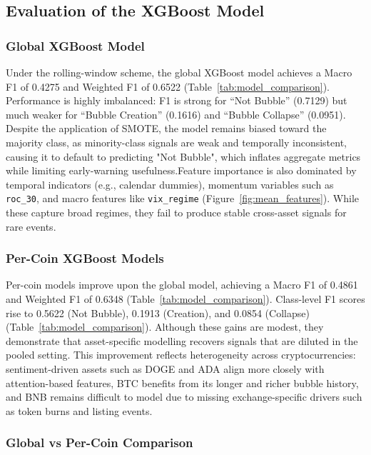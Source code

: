 \documentclass[12pt,a4paper]{article}
\begin{document}
\subsection{Evaluation of the XGBoost Model}

\subsubsection{Global XGBoost Model}

Under the rolling-window scheme, the global XGBoost model achieves a Macro F1 of 0.4275 and Weighted F1 of 0.6522 (Table~\ref{tab:model_comparison}). Performance is highly imbalanced: F1 is strong for “Not Bubble” (0.7129) but much weaker for “Bubble Creation” (0.1616) and “Bubble Collapse” (0.0951). Despite the application of SMOTE, the model remains biased toward the majority class, as minority-class signals are weak and temporally inconsistent, causing it to default to predicting "Not Bubble", which inflates aggregate metrics while limiting early-warning usefulness.Feature importance is also dominated by temporal indicators (e.g., calendar dummies), momentum variables such as \texttt{roc\_30}, and macro features like \texttt{vix\_regime} (Figure~\ref{fig:mean_features}). While these capture broad regimes, they fail to produce stable cross-asset signals for rare events.


\subsubsection{Per-Coin XGBoost Models}

Per-coin models improve upon the global model, achieving a Macro F1 of 0.4861 and Weighted F1 of 0.6348 (Table~\ref{tab:model_comparison}). Class-level F1 scores rise to 0.5622 (Not Bubble), 0.1913 (Creation), and 0.0854 (Collapse) (Table~\ref{tab:model_comparison}). Although these gains are modest, they demonstrate that asset-specific modelling recovers signals that are diluted in the pooled setting. This improvement reflects heterogeneity across cryptocurrencies: sentiment-driven assets such as DOGE and ADA align more closely with attention-based features, BTC benefits from its longer and richer bubble history, and BNB remains difficult to model due to missing exchange-specific drivers such as token burns and listing events.
 

\subsubsection{Global vs Per-Coin Comparison}
\end{document}

